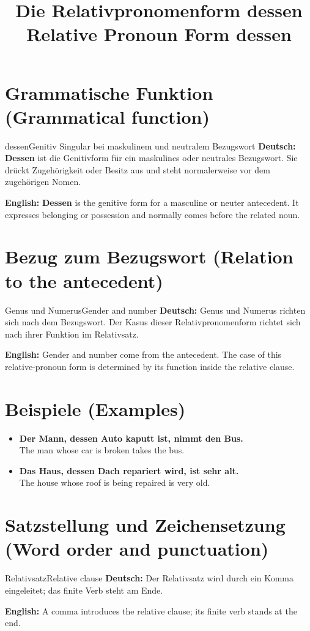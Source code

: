 \documentclass[a4paper,11pt]{article}
\title{Die Relativpronomenform \glqq dessen\grqq{}\\\large Relative Pronoun Form \glqq dessen\grqq{}}
\date{}
\newcommand{\GermanText}[1]{\textbf{Deutsch: }#1\par}
\newcommand{\EnglishText}[1]{{\small\color{SoftGray}\textbf{English: }#1\par}}
\newcommand{\ExampleItem}[2]{\item \textbf{#1}\\{\small\color{SoftGray}#2}}
\begin{document}
\maketitle
\tableofcontents
\newpage
\section{Grammatische Funktion (Grammatical function)}
\begin{grammarentry}{dessen}{Genitiv Singular bei maskulinem und neutralem Bezugswort}
\GermanText{\textbf{Dessen} ist die Genitivform für ein maskulines oder neutrales Bezugswort. Sie drückt Zugehörigkeit oder Besitz aus und steht normalerweise vor dem zugehörigen Nomen.}
\EnglishText{\textbf{Dessen} is the genitive form for a masculine or neuter antecedent. It expresses belonging or possession and normally comes before the related noun.}
\end{grammarentry}
\section{Bezug zum Bezugswort (Relation to the antecedent)}
\begin{grammarentry}{Genus und Numerus}{Gender and number}
\GermanText{Genus und Numerus richten sich nach dem Bezugswort. Der Kasus dieser Relativpronomenform richtet sich nach ihrer Funktion im Relativsatz.}
\EnglishText{Gender and number come from the antecedent. The case of this relative-pronoun form is determined by its function inside the relative clause.}
\end{grammarentry}
\section{Beispiele (Examples)}
\begin{exbox}\begin{itemize}
\ExampleItem{Der Mann, dessen Auto kaputt ist, nimmt den Bus.}{The man whose car is broken takes the bus.}
\ExampleItem{Das Haus, dessen Dach repariert wird, ist sehr alt.}{The house whose roof is being repaired is very old.}
\end{itemize}\end{exbox}
\section{Satzstellung und Zeichensetzung (Word order and punctuation)}
\begin{grammarentry}{Relativsatz}{Relative clause}
\GermanText{Der Relativsatz wird durch ein Komma eingeleitet; das finite Verb steht am Ende.}
\EnglishText{A comma introduces the relative clause; its finite verb stands at the end.}
\end{grammarentry}
\end{document}
